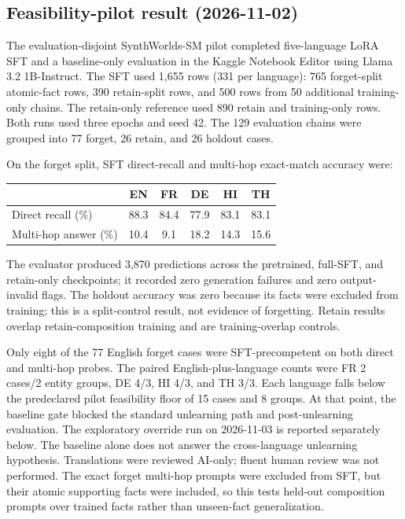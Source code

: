 \documentclass[10pt,a4paper]{article}
\begin{document}
\subsection*{Feasibility-pilot result (2026-11-02)}

The evaluation-disjoint SynthWorlds-SM pilot completed five-language LoRA SFT and a baseline-only evaluation in the Kaggle Notebook Editor using Llama 3.2 1B-Instruct. The SFT used 1,655 rows (331 per language): 765 forget-split atomic-fact rows, 390 retain-split rows, and 500 rows from 50 additional training-only chains. The retain-only reference used 890 retain and training-only rows. Both runs used three epochs and seed 42. The 129 evaluation chains were grouped into 77 forget, 26 retain, and 26 holdout cases.

On the forget split, SFT direct-recall and multi-hop exact-match accuracy were:

\begin{center}
\begin{tabular}{lccccc}
\toprule
 & EN & FR & DE & HI & TH \\
\midrule
Direct recall (\%) & 88.3 & 84.4 & 77.9 & 83.1 & 83.1 \\
Multi-hop answer (\%) & 10.4 & 9.1 & 18.2 & 14.3 & 15.6 \\
\bottomrule
\end{tabular}
\end{center}

The evaluator produced 3,870 predictions across the pretrained, full-SFT, and retain-only checkpoints; it recorded zero generation failures and zero output-invalid flags. The holdout accuracy was zero because its facts were excluded from training; this is a split-control result, not evidence of forgetting. Retain results overlap retain-composition training and are training-overlap controls.

Only eight of the 77 English forget cases were SFT-precompetent on both direct and multi-hop probes. The paired English-plus-language counts were FR 2 cases/2 entity groups, DE 4/3, HI 4/3, and TH 3/3. Each language falls below the predeclared pilot feasibility floor of 15 cases and 8 groups. At that point, the baseline gate blocked the standard unlearning path and post-unlearning evaluation. The exploratory override run on 2026-11-03 is reported separately below. The baseline alone does not answer the cross-language unlearning hypothesis. Translations were reviewed AI-only; fluent human review was not performed. The exact forget multi-hop prompts were excluded from SFT, but their atomic supporting facts were included, so this tests held-out composition prompts over trained facts rather than unseen-fact generalization.
\end{document}
